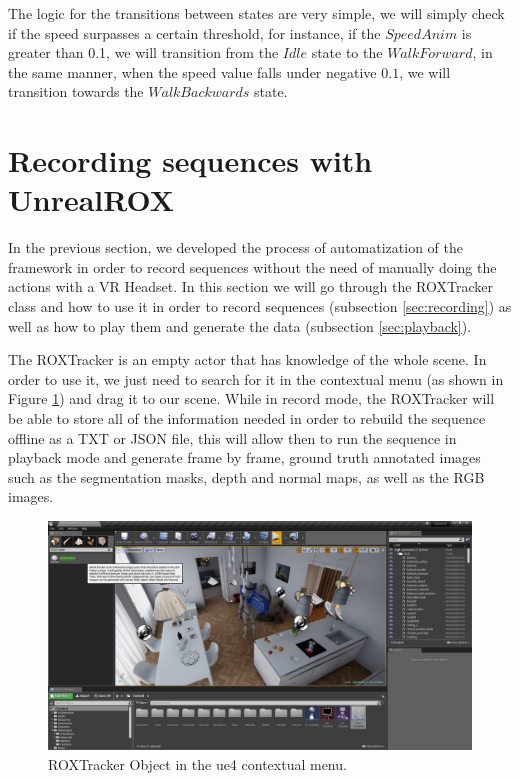 The logic for the transitions between states are very simple, we will simply check if the speed surpasses a certain threshold, for instance, if the $Speed Anim$ is greater than 0.1, we will transition from the $Idle$ state to the $WalkForward$, in the same manner, when the speed value falls under negative $0.1$, we will transition towards the $WalkBackwards$ state.

\section{Recording sequences with UnrealROX}
\label{sec:tracker}
In the previous section, we developed the process of automatization of the framework in order to record sequences without the need of manually doing the actions with a VR Headset. In this section we will go through the ROXTracker class and how to use it in order to record sequences (subsection \ref{sec:recording}) as well as how to play them and generate the data (subsection \ref{sec:playback}).

The ROXTracker is an empty actor that has knowledge of the whole scene. In order to use it, we just need to search for it in the contextual menu (as shown in Figure \ref{fig:tracker_object}) and drag it to our scene. While in record mode, the ROXTracker will be able to store all of the information needed in order to rebuild the sequence offline as a TXT or JSON file, this will allow then to run the sequence in playback mode and generate frame by frame, ground truth annotated images such as the segmentation masks, depth and normal maps, as well as the RGB images.

\begin{figure}[h]
	\includegraphics[width=\textwidth]{archivos/tracker_object.png}
	\centering
	\caption{ROXTracker Object in the \gls{ue4} contextual menu.}
	\label{fig:tracker_object}
\end{figure}

